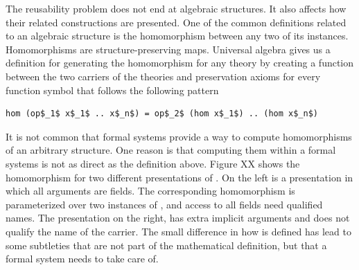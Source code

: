 The reusability problem does not end at algebraic structures. It also affects how their related constructions are presented. One of the common definitions related to an algebraic structure is the homomorphism between any two of its instances. Homomorphisms are structure-preserving maps. Universal algebra gives us a definition for generating the homomorphism for any theory  by creating a function between the two carriers of the theories and preservation axioms for every function symbol  that follows the following pattern 
\begin{lstlisting}[mathescape]
hom (op$_1$ x$_1$ .. x$_n$) = op$_2$ (hom x$_1$) .. (hom x$_n$)
\end{lstlisting}
It is not common that formal systems provide a way to compute homomorphisms of an arbitrary structure. One reason is that computing them within a formal systems is not as direct as the definition above. Figure XX shows the  homomorphism for two different presentations of . On the left is a presentation in which all arguments are fields. The corresponding homomorphism is parameterized over two instances of , and access to all fields need qualified names. The presentation on the right, has extra implicit arguments and does not qualify the name of the carrier. The small difference in how  is defined has lead to some subtleties that are not part of the mathematical definition, but that a formal system needs to take care of. 




